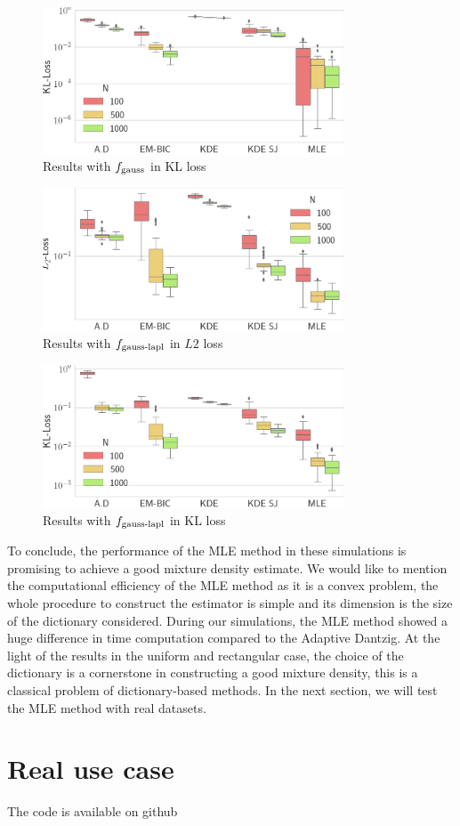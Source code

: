 \begin{figure}
    \includegraphics[width=0.8\textwidth]{./TeX_files/res_gauss_KL.png}
    \caption{Results with $f_{\textnormal{gauss}}$ in KL loss}
    \label{fig:res_gauss_KL}
\end{figure}   

\begin{figure}
    \includegraphics[width=0.8\textwidth]{./TeX_files/res_lapl_gauss_L2.png}
    \caption{Results with $f_{\textnormal{gauss-lapl}}$ in $L2$ loss}
    \label{fig:res_lapl_gauss_L2}
\end{figure}

\begin{figure}
    \includegraphics[width=0.8\textwidth]{./TeX_files/res_lapl_gauss_KL.png}
    \caption{Results with $f_{\textnormal{gauss-lapl}}$ in KL loss}
    \label{fig:res_lapl_gauss_KL}
\end{figure}
To conclude, the performance of the MLE method in these simulations is promising to achieve a good mixture density estimate. We would like to mention the computational efficiency of the MLE method as it is a convex problem, the whole procedure to construct the estimator is simple and its dimension is the size of the dictionary considered. During our simulations, the MLE method showed a huge difference in time computation compared to the Adaptive Dantzig. At the light of the results in the uniform and rectangular case, the choice of the dictionary is a cornerstone in constructing a good mixture density, this is a classical problem of dictionary-based methods. In the next section, we will test the MLE method with real datasets.




\section{Real use case}

The code is available on github